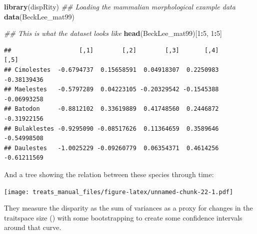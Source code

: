 \documentclass[
]{book}
\newenvironment{Shaded}{\begin{snugshade}}{\end{snugshade}}
\newcommand{\CommentTok}[1]{\textcolor[rgb]{0.56,0.35,0.01}{\textit{#1}}}
\newcommand{\DataTypeTok}[1]{\textcolor[rgb]{0.13,0.29,0.53}{#1}}
\newcommand{\DecValTok}[1]{\textcolor[rgb]{0.00,0.00,0.81}{#1}}
\newcommand{\FloatTok}[1]{\textcolor[rgb]{0.00,0.00,0.81}{#1}}
\newcommand{\KeywordTok}[1]{\textcolor[rgb]{0.13,0.29,0.53}{\textbf{#1}}}
\newcommand{\NormalTok}[1]{#1}
\newcommand{\OperatorTok}[1]{\textcolor[rgb]{0.81,0.36,0.00}{\textbf{#1}}}
\newcommand{\StringTok}[1]{\textcolor[rgb]{0.31,0.60,0.02}{#1}}
\begin{document}
\begin{Shaded}
\begin{Highlighting}[]
\KeywordTok{library}\NormalTok{(dispRity)}
\CommentTok{\#\# Loading the mammalian morphological example data}
\KeywordTok{data}\NormalTok{(BeckLee\_mat99)}

\CommentTok{\#\# This is what the dataset looks like}
\KeywordTok{head}\NormalTok{(BeckLee\_mat99)[}\DecValTok{1}\OperatorTok{:}\DecValTok{5}\NormalTok{, }\DecValTok{1}\OperatorTok{:}\DecValTok{5}\NormalTok{]}
\end{Highlighting}
\end{Shaded}

\begin{verbatim}
##                   [,1]        [,2]        [,3]       [,4]        [,5]
## Cimolestes  -0.6794737  0.15658591  0.04918307  0.2250983 -0.38139436
## Maelestes   -0.5797289  0.04223105 -0.20329542 -0.1545388 -0.06993258
## Batodon     -0.8812102  0.33619889  0.41748560  0.2446872 -0.31922156
## Bulaklestes -0.9295090 -0.08517626  0.11364659  0.3589646 -0.54998508
## Daulestes   -1.0025229 -0.09260779  0.06354371  0.4614256 -0.61211569
\end{verbatim}

And a tree showing the relation between these species through time:

\begin{Shaded}
\end{Shaded}

\texttt{[image: treats\_manual\_files/figure-latex/unnamed-chunk-22-1.pdf]}

They measure the disparity as the sum of variances as a proxy for changes in the traitspace size (\citet{moms}) with some bootstrapping to create some confidence intervals around that curve.
\end{document}
